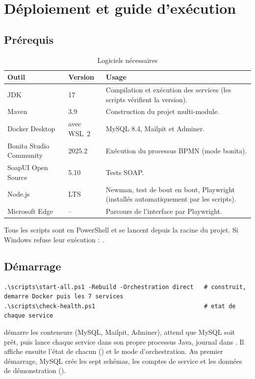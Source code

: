 \chapter{Déploiement et guide d'exécution}\label{chap:deploiement}

\section{Prérequis}

\begin{table}[H]
\centering\small
\begin{tabularx}{\linewidth}{@{}l l>{\raggedright\arraybackslash}X@{}}
\toprule
\textbf{Outil} & \textbf{Version} & \textbf{Usage} \\ \midrule
JDK & 17 & Compilation et exécution des services (les scripts vérifient la version). \\
Maven & 3.9 & Construction du projet multi-module. \\
Docker Desktop & avec WSL~2 & MySQL 8.4, Mailpit et Adminer. \\
Bonita Studio Community & 2025.2 & Exécution du processus BPMN (mode bonita). \\
SoapUI Open Source & 5.10 & Tests SOAP. \\
Node.js & LTS & Newman, test de bout en bout, Playwright (installés automatiquement par les scripts). \\
Microsoft Edge & – & Parcours de l'interface par Playwright. \\
\bottomrule
\end{tabularx}
\caption{Logiciels nécessaires}\label{tab:prerequis}
\end{table}

Tous les scripts sont en PowerShell et se lancent depuis la racine du projet. Si Windows refuse leur exécution : .

\section{Démarrage}

\begin{lstlisting}[language={}, caption={Démarrage complet}]
.\scripts\start-all.ps1 -Rebuild -Orchestration direct   # construit, demarre Docker puis les 7 services
.\scripts\check-health.ps1                               # etat de chaque service
\end{lstlisting}

 démarre les conteneurs (MySQL, Mailpit, Adminer), attend que MySQL soit prêt, puis lance chaque service dans son propre processus Java, journal dans . Il affiche ensuite l'état de chacun () et le mode d'orchestration. Au premier démarrage, MySQL crée les sept schémas, les comptes de service et les données de démonstration ().

